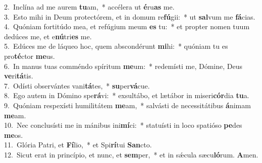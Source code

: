 {2.~}Inclína ad me aurem \textbf{tu}am,~* accélera ut \textbf{é}ru\textbf{as} me.\\
{3.~}Esto mihi in Deum protectórem, et in domum re\textbf{fú}gii:~* ut \textbf{sal}vum me \textbf{fá}cias.\\
{4.~}Quóniam fortitúdo mea, et refúgium meum \textbf{es} tu:~* et propter nomen tuum dedúces me, et e\textbf{nú}tri\textbf{es} me.\\
{5.~}Edúces me de láqueo hoc, quem abscondérunt \textbf{mi}hi:~* quóniam tu es pro\textbf{té}ctor \textbf{me}us.\\
{6.~}In manus tuas comméndo spíritum \textbf{me}um:~* redemísti me, Dómine, Deus \textbf{ve}ri\textbf{tá}tis.\\
{7.~}Odísti observántes vani\textbf{tá}tes,~* \textbf{su}per\textbf{vá}cue.\\
{8.~}Ego autem in Dómino spe\textbf{rá}vi:~* exsultábo, et lætábor in miseri\textbf{cór}dia \textbf{tu}a.\\
{9.~}Quóniam respexísti humilitátem \textbf{me}am,~* salvásti de necessitátibus \textbf{á}nimam \textbf{me}am.\\
{10.~}Nec conclusísti me in mánibus ini\textbf{mí}ci:~* statuísti in loco spatióso \textbf{pe}des \textbf{me}os.\\
{11.~}Glória Patri, et \textbf{Fí}lio,~* et Spi\textbf{rí}tui \textbf{San}cto.\\
{12.~}Sicut erat in princípio, et nunc, et \textbf{sem}per,~* et in sǽcula sæcu\textbf{ló}rum. \textbf{A}men.\\
